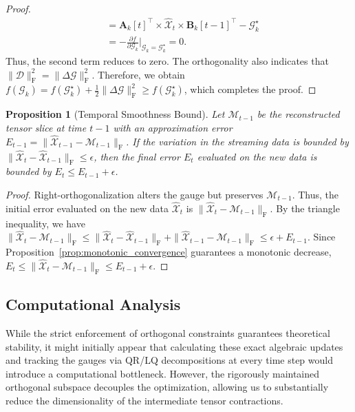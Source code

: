 \documentclass[a4paper, 11pt]{article}
\theoremstyle{plain}
\newtheorem{proposition}[theorem]{Proposition}
\theoremstyle{definition}
\theoremstyle{remark}
\begin{document}
\begin{proof}
\begin{align*}
        &= \mathbf{A}_k[t]^\top \times \widehat{\mathcal{X}}_t \times \mathbf{B}_k[t-1]^\top - \mathcal{G}_k^\star \\
        &= -\frac{\partial f}{\partial \mathcal{G}_k} \bigg|_{\mathcal{G}_k = \mathcal{G}_k^\star} = 0.
    \end{align*}
    Thus, the second term reduces to zero.
    The orthogonality also indicates that $\|\mathcal{D}\|_\mathrm{F}^2 = \|\Delta\mathcal{G}\|_\mathrm{F}^2$.
    Therefore, we obtain $f(\mathcal{G}_k) = f(\mathcal{G}_k^\star) + \frac{1}{2} \|\Delta\mathcal{G}\|_\mathrm{F}^2 \geq f(\mathcal{G}_k^\star)$, which completes the proof.
\end{proof}

\begin{proposition}[Temporal Smoothness Bound]
    Let $\mathcal{M}_{t-1}$ be the reconstructed tensor slice at time $t-1$ with an approximation error $E_{t-1} = \|\widehat{\mathcal{X}}_{t-1} - \mathcal{M}_{t-1}\|_\mathrm{F}$.
    If the variation in the streaming data is bounded by $\|\widehat{\mathcal{X}}_t - \widehat{\mathcal{X}}_{t-1}\|_\mathrm{F} \leq \epsilon$, then the final error $E_t$ evaluated on the new data is bounded by $E_t \leq E_{t-1} + \epsilon$.     
\end{proposition}
\begin{proof}
    Right-orthogonalization alters the gauge but preserves $\mathcal{M}_{t-1}$.
    Thus, the initial error evaluated on the new data $\widehat{\mathcal{X}}_t$ is $\|\widehat{\mathcal{X}}_t - \mathcal{M}_{t-1}\|_\mathrm{F}$.
    By the triangle inequality, we have $\|\widehat{\mathcal{X}}_t - \mathcal{M}_{t-1}\|_\mathrm{F} \leq \|\widehat{\mathcal{X}}_t - \widehat{\mathcal{X}}_{t-1}\|_\mathrm{F} + \|\widehat{\mathcal{X}}_{t-1} - \mathcal{M}_{t-1}\|_\mathrm{F} \leq \epsilon + E_{t-1}$.
    Since Proposition~\ref{prop:monotonic_convergence} guarantees a monotonic decrease, $E_t \leq \|\widehat{\mathcal{X}}_t - \mathcal{M}_{t-1}\|_\mathrm{F} \leq E_{t-1} + \epsilon$.
\end{proof}

\subsection{Computational Analysis}
\label{subsec:computational_complexity}
While the strict enforcement of orthogonal constraints guarantees theoretical stability, it might initially appear that calculating these exact algebraic updates and tracking the gauges via QR/LQ decompositions at every time step would introduce a computational bottleneck.
However, the rigorously maintained orthogonal subspace decouples the optimization, allowing us to substantially reduce the dimensionality of the intermediate tensor contractions.
\end{document}
